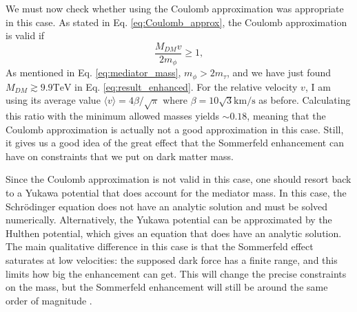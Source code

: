 We must now check whether using the Coulomb approximation was appropriate in this case. As stated in Eq. \eqref{eq:Coulomb_approx}, the Coulomb approximation is valid if
\begin{equation}
	\frac{M_{DM} v}{2 m_{\phi } } \geq 1,
\end{equation}
As mentioned in Eq. \eqref{eq:mediator_mass}, \(m_{\phi } > 2 m_{\tau } \), and we have just found \(M_{DM} \gtrsim 9.9 \mathrm{TeV} \) in Eq. \eqref{eq:result_enhanced}. For the relative velocity \(v\), I am using its average value \(\langle v \rangle = 4 \beta /\sqrt{\pi } \) where \(\beta = 10 \sqrt{3}  \mathrm{km / s} \) as before. Calculating this ratio with the minimum allowed masses yields \(\sim 0.18\), meaning that the Coulomb approximation is actually not a good approximation in this case. Still, it gives us a good idea of the great effect that the Sommerfeld enhancement can have on constraints that we put on dark matter mass.

Since the Coulomb approximation is not valid in this case, one should resort back to a Yukawa potential that does account for the mediator mass. In this case, the Schrödinger equation does not have an analytic solution and must be solved numerically. Alternatively, the Yukawa potential can be approximated by the Hulthen potential, which gives an equation that does have an analytic solution. The main qualitative difference in this case is that the Sommerfeld effect saturates at low velocities: the supposed dark force has a finite range, and this limits how big the enhancement can get. This will change the precise constraints on the mass, but the Sommerfeld enhancement will still be around the same order of magnitude \cite{Arkani_2009}.